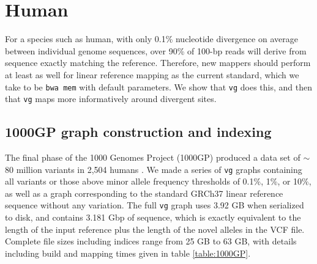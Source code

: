 \documentclass[a4paper,12pt,numbered,oneside]{Classes/PhDThesisPSnPDF}
\begin{document}
\section{Human}

For a species such as human, with only 0.1\% nucleotide divergence on average between individual genome sequences, over 90\% of 100-bp reads will derive from sequence exactly matching the reference.
Therefore, new mappers should perform at least as well for linear reference mapping as the current standard, which we take to be {\tt bwa mem} with default parameters.
We show that {\tt vg} does this, and then that {\tt vg} maps more informatively around divergent sites.

\subsection{1000GP graph construction and indexing}

The final phase of the 1000 Genomes Project (1000GP) produced a data set of $\sim$80 million variants in 2,504 humans \cite{1000g2015}.
We made a series of {\tt vg} graphs containing all variants or those above minor allele frequency thresholds of 0.1\%, 1\%, or 10\%, as well as a graph corresponding to the standard GRCh37 linear reference sequence without any variation.
The full {\tt vg} graph uses 3.92 GB when serialized to disk, and contains 3.181 Gbp of sequence, which is exactly equivalent to the length of the input reference plus the length of the novel alleles in the VCF file.
Complete file sizes including indices range from 25 GB to 63 GB, with details including build and mapping times given in table \ref{table:1000GP}.
\end{document}

